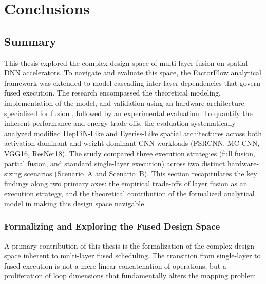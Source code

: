 \chapter{Conclusions}
\label{ch:conclusions}

\section{Summary}
\label{sec:concl-summary}

This thesis explored the complex design space of multi-layer fusion on spatial DNN accelerators.
To navigate and evaluate this space, the FactorFlow analytical framework was extended to model cascading inter-layer dependencies that govern fused execution. 
The research encompassed the theoretical modeling, implementation of the model, and validation using
an hardware architecture specialized for fusion \cite{goetschalckx2023depfin}, followed by an experimental evaluation. 
To quantify the inherent performance and energy trade-offs, the evaluation systematically analyzed
modified DepFiN-Like and Eyeriss-Like spatial architectures across both activation-dominant
and weight-dominant CNN workloads (FSRCNN, MC-CNN, VGG16, ResNet18). The study compared three execution
strategies (full fusion, partial fusion, and standard single-layer execution) across two distinct
hardware-sizing scenarios (Scenario~A and Scenario~B). This section recapitulates the key findings along
two primary axes: the empirical trade-offs of layer fusion as an execution strategy, and the theoretical 
contribution of the formalized analytical model in making this design space navigable.

\subsection{Formalizing and Exploring the Fused Design Space}
\label{sec:concl-design-space-impact}

A primary contribution of this thesis is the formalization of the complex design space inherent to multi-layer fused scheduling. The transition from single-layer to fused execution is not a mere linear concatenation of operations, but a proliferation of loop dimensions that fundamentally alters the mapping problem. 

